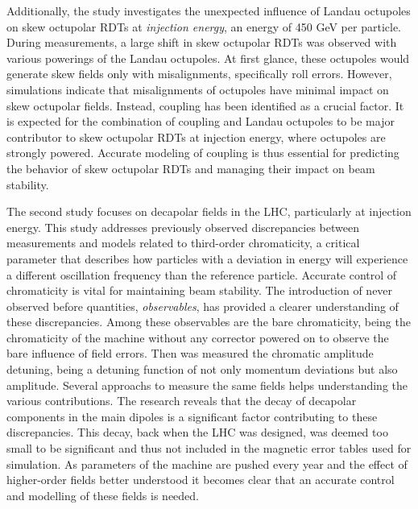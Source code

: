 {Additionally, the study investigates the unexpected influence of Landau octupoles on skew octupolar
RDTs at \textit{injection energy}, an energy of 450 GeV per particle. During measurements, a large 
shift in skew octupolar RDTs was observed with various powerings of the Landau octupoles. At first
glance, these octupoles would generate skew fields only with misalignments, specifically roll 
errors. However, simulations indicate that misalignments of octupoles have minimal impact on skew
octupolar fields.  Instead, coupling has been identified as a crucial factor. It is expected for the
combination of coupling and Landau octupoles to be major contributor to skew octupolar RDTs at
injection energy, where octupoles are strongly powered.  Accurate modeling of coupling is thus
essential for predicting the behavior of skew octupolar RDTs and managing their impact on beam
stability.


The second study focuses on decapolar fields in the LHC, particularly at injection energy. This
study addresses previously observed discrepancies between measurements and models related to
third-order chromaticity, a critical parameter that describes how particles with a deviation in
energy will experience a different oscillation frequency than the reference particle.
Accurate control of chromaticity is vital for maintaining beam stability. 
The introduction of never observed before quantities, \textit{observables}, has provided a
clearer understanding of these discrepancies. Among these observables are the bare
chromaticity, being the chromaticity of the machine without any corrector powered on to observe the
bare influence of field errors. Then was measured the chromatic amplitude detuning, being a detuning
function of not only momentum deviations but also amplitude. Several approachs to measure the same
fields helps understanding the various contributions.
The research reveals that the decay of decapolar components in the main dipoles is a significant
factor contributing to these discrepancies. This decay, back when the LHC was designed, was deemed
too small to be significant and thus not included in the magnetic error tables used for simulation.
As parameters of the machine are pushed every year and the effect of higher-order fields better 
understood it becomes clear that an accurate control and modelling of these fields is needed.

}
